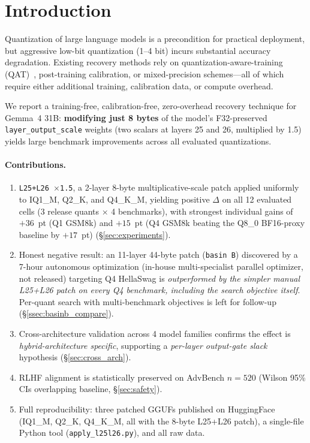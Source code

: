 \documentclass[11pt]{article}
\begin{document}
\section{Introduction}
\label{sec:intro}

Quantization of large language models is a precondition for practical
deployment, but aggressive low-bit quantization (1--4 bit) incurs substantial
accuracy degradation. Existing recovery methods rely on
quantization-aware-training (QAT)~\cite{gptq,awq,smoothquant},
post-training calibration, or mixed-precision schemes---all of which require
either additional training, calibration data, or compute overhead.

We report a training-free, calibration-free, zero-overhead recovery technique
for Gemma~4 31B: \textbf{modifying just 8 bytes} of the model's F32-preserved
\texttt{layer\_output\_scale} weights (two scalars at layers 25 and 26,
multiplied by 1.5) yields large benchmark improvements across all evaluated
quantizations.

\paragraph{Contributions.}
\begin{enumerate}[leftmargin=*,itemsep=0pt]
  \item \texttt{L25+L26 $\times$1.5}, a 2-layer 8-byte multiplicative-scale
    patch applied uniformly to IQ1\_M, Q2\_K, and Q4\_K\_M, yielding positive
    $\Delta$ on all 12 evaluated cells (3 release quants $\times$ 4 benchmarks),
    with strongest individual gains of $+36$~pt (Q1 GSM8k) and $+15$~pt
    (Q4 GSM8k beating the Q8\_0 BF16-proxy baseline by $+17$~pt)
    (\S\ref{sec:experiments}).
  \item Honest negative result: an 11-layer 44-byte patch
    (\texttt{basin~B}) discovered by a 7-hour autonomous optimization
    (in-house multi-specialist parallel optimizer, not released) targeting Q4 HellaSwag is
    \emph{outperformed by the simpler manual L25+L26 patch on every Q4
    benchmark, including the search objective itself}. Per-quant search with
    multi-benchmark objectives is left for follow-up
    (\S\ref{ssec:basinb_compare}).
  \item Cross-architecture validation across 4 model families confirms the
    effect is \emph{hybrid-architecture specific}, supporting a \emph{per-layer output-gate slack} hypothesis (\S\ref{sec:cross_arch}).
  \item RLHF alignment is statistically preserved on AdvBench $n{=}520$
    (Wilson 95\% CIs overlapping baseline, \S\ref{sec:safety}).
  \item Full reproducibility: three patched GGUFs published on HuggingFace
    (IQ1\_M, Q2\_K, Q4\_K\_M, all with the 8-byte L25+L26 patch), a
    single-file Python tool (\texttt{apply\_l25l26.py}), and all raw data.
\end{enumerate}
\end{document}

